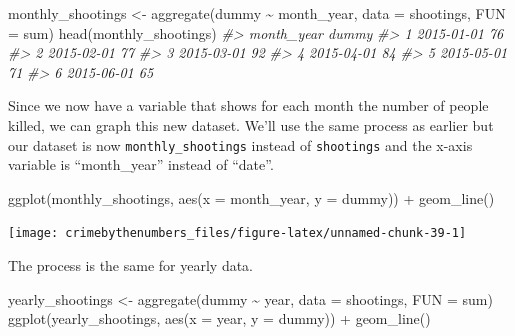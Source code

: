 \documentclass[
]{krantz}
\makeatletter
\newenvironment{Shaded}{\begin{snugshade}}{\end{snugshade}}
\newcommand{\AttributeTok}[1]{\textcolor[rgb]{0.61,0.61,0.61}{#1}}
\newcommand{\CommentTok}[1]{\textcolor[rgb]{0.37,0.37,0.37}{\textit{#1}}}
\newcommand{\FunctionTok}[1]{\textcolor[rgb]{0,0,0}{#1}}
\newcommand{\NormalTok}[1]{#1}
\newcommand{\OtherTok}[1]{\textcolor[rgb]{0.37,0.37,0.37}{#1}}
\newcommand{\SpecialCharTok}[1]{\textcolor[rgb]{0,0,0}{#1}}
\newenvironment{kframe}{%
\medskip{}
\setlength{\fboxsep}{.8em}
 \def\at@end@of@kframe{}%
 \ifinner\ifhmode%
  \def\at@end@of@kframe{\end{minipage}}%
  \begin{minipage}{\columnwidth}%
 \fi\fi%
 \def\FrameCommand##1{\hskip\@totalleftmargin \hskip-\fboxsep
 \colorbox{shadecolor}{##1}\hskip-\fboxsep
     \hskip-\linewidth \hskip-\@totalleftmargin \hskip\columnwidth}%
 \MakeFramed {\advance\hsize-\width
   \@totalleftmargin\z@ \linewidth\hsize
   \@setminipage}}%
 {\par\unskip\endMakeFramed%
 \at@end@of@kframe}
\renewenvironment{Shaded}{\begin{kframe}}{\end{kframe}}
\makeatother
\begin{document}
\begin{Shaded}
\begin{Highlighting}[]
\NormalTok{monthly\_shootings }\OtherTok{\textless{}{-}} \FunctionTok{aggregate}\NormalTok{(dummy }\SpecialCharTok{\textasciitilde{}}\NormalTok{ month\_year, }\AttributeTok{data =}\NormalTok{ shootings,}
  \AttributeTok{FUN =}\NormalTok{ sum)}
\FunctionTok{head}\NormalTok{(monthly\_shootings)}
\CommentTok{\#\textgreater{}   month\_year dummy}
\CommentTok{\#\textgreater{} 1 2015{-}01{-}01    76}
\CommentTok{\#\textgreater{} 2 2015{-}02{-}01    77}
\CommentTok{\#\textgreater{} 3 2015{-}03{-}01    92}
\CommentTok{\#\textgreater{} 4 2015{-}04{-}01    84}
\CommentTok{\#\textgreater{} 5 2015{-}05{-}01    71}
\CommentTok{\#\textgreater{} 6 2015{-}06{-}01    65}
\end{Highlighting}
\end{Shaded}

Since we now have a variable that shows for each month the number of people killed, we can graph this new dataset. We'll use the same process as earlier but our dataset is now \texttt{monthly\_shootings} instead of \texttt{shootings} and the x-axis variable is ``month\_year'' instead of ``date''.

\begin{Shaded}
\begin{Highlighting}[]
\FunctionTok{ggplot}\NormalTok{(monthly\_shootings, }\FunctionTok{aes}\NormalTok{(}\AttributeTok{x =}\NormalTok{ month\_year, }\AttributeTok{y =}\NormalTok{ dummy)) }\SpecialCharTok{+}
  \FunctionTok{geom\_line}\NormalTok{()}
\end{Highlighting}
\end{Shaded}

\begin{center}\texttt{[image: crimebythenumbers\_files/figure-latex/unnamed-chunk-39-1]} \end{center}

The process is the same for yearly data.

\begin{Shaded}
\begin{Highlighting}[]
\NormalTok{yearly\_shootings }\OtherTok{\textless{}{-}} \FunctionTok{aggregate}\NormalTok{(dummy }\SpecialCharTok{\textasciitilde{}}\NormalTok{ year, }\AttributeTok{data =}\NormalTok{ shootings,}
  \AttributeTok{FUN =}\NormalTok{ sum)}
\FunctionTok{ggplot}\NormalTok{(yearly\_shootings, }\FunctionTok{aes}\NormalTok{(}\AttributeTok{x =}\NormalTok{ year, }\AttributeTok{y =}\NormalTok{ dummy)) }\SpecialCharTok{+} \FunctionTok{geom\_line}\NormalTok{()}
\end{Highlighting}
\end{Shaded}
\end{document}
